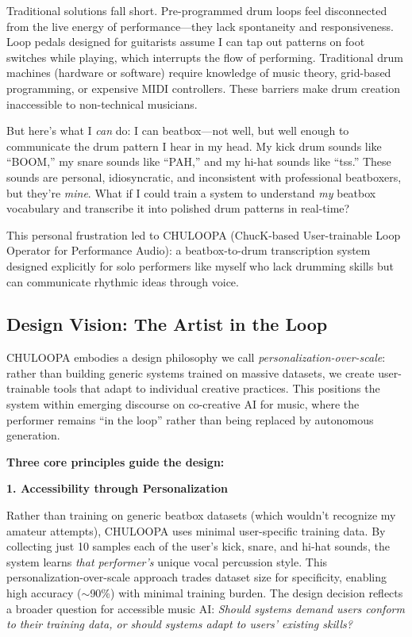 \documentclass{aimc2026}
\begin{document}
Traditional solutions fall short. Pre-programmed drum loops feel disconnected from the live energy of performance---they lack spontaneity and responsiveness. Loop pedals designed for guitarists assume I can tap out patterns on foot switches while playing, which interrupts the flow of performing. Traditional drum machines (hardware or software) require knowledge of music theory, grid-based programming, or expensive MIDI controllers. These barriers make drum creation inaccessible to non-technical musicians.

But here's what I \emph{can} do: I can beatbox---not well, but well enough to communicate the drum pattern I hear in my head. My kick drum sounds like ``BOOM,'' my snare sounds like ``PAH,'' and my hi-hat sounds like ``tss.'' These sounds are personal, idiosyncratic, and inconsistent with professional beatboxers, but they're \emph{mine}. What if I could train a system to understand \emph{my} beatbox vocabulary and transcribe it into polished drum patterns in real-time?

This personal frustration led to CHULOOPA (ChucK-based User-trainable Loop Operator for Performance Audio): a beatbox-to-drum transcription system designed explicitly for solo performers like myself who lack drumming skills but can communicate rhythmic ideas through voice.

\subsection{Design Vision: The Artist in the Loop}

CHULOOPA embodies a design philosophy we call \emph{personalization-over-scale}: rather than building generic systems trained on massive datasets, we create user-trainable tools that adapt to individual creative practices. This positions the system within emerging discourse on co-creative AI for music, where the performer remains ``in the loop'' rather than being replaced by autonomous generation.

\textbf{Three core principles guide the design:}

\textbf{1. Accessibility through Personalization}

Rather than training on generic beatbox datasets (which wouldn't recognize my amateur attempts), CHULOOPA uses minimal user-specific training data. By collecting just 10 samples each of the user's kick, snare, and hi-hat sounds, the system learns \emph{that performer's} unique vocal percussion style. This personalization-over-scale approach trades dataset size for specificity, enabling high accuracy ($\sim$90\%) with minimal training burden. The design decision reflects a broader question for accessible music AI: \emph{Should systems demand users conform to their training data, or should systems adapt to users' existing skills?}
\end{document}
